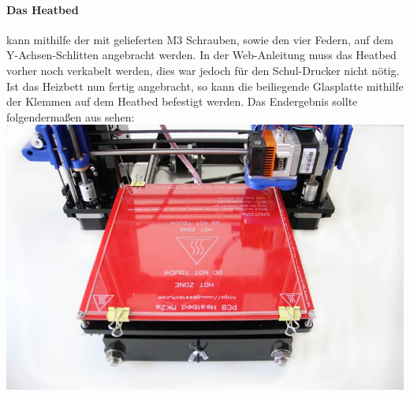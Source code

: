 \paragraph{Das Heatbed} kann mithilfe der mit gelieferten M3 Schrauben, sowie den vier Federn, auf dem Y-Achsen-Schlitten angebracht werden. In der Web-Anleitung muss das Heatbed vorher noch verkabelt werden, dies war jedoch für den Schul-Drucker nicht nötig. Ist das Heizbett nun fertig angebracht, so kann die beiliegende Glasplatte mithilfe der Klemmen auf dem Heatbed befestigt werden. Das Endergebnis sollte folgendermaßen aus sehen:\\
\includegraphics[width=\textwidth]{Bilder/Assembled_BED.jpg}


